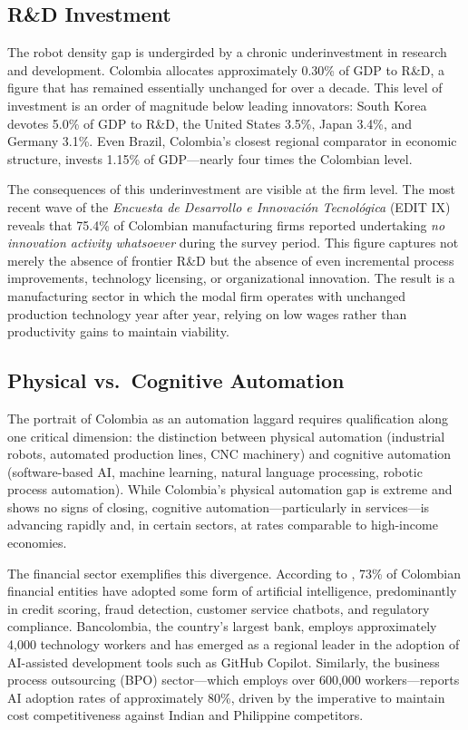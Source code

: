 \documentclass{article}
\begin{document}
\subsection{R\&D Investment}
\label{subsec:rd_investment}

The robot density gap is undergirded by a chronic underinvestment in research and development. Colombia allocates approximately 0.30\% of GDP to R\&D, a figure that has remained essentially unchanged for over a decade. This level of investment is an order of magnitude below leading innovators: South Korea devotes 5.0\% of GDP to R\&D, the United States 3.5\%, Japan 3.4\%, and Germany 3.1\%. Even Brazil, Colombia's closest regional comparator in economic structure, invests 1.15\% of GDP---nearly four times the Colombian level.

The consequences of this underinvestment are visible at the firm level. The most recent wave of the \textit{Encuesta de Desarrollo e Innovaci\'on Tecnol\'ogica} (EDIT IX) reveals that 75.4\% of Colombian manufacturing firms reported undertaking \textit{no innovation activity whatsoever} during the survey period. This figure captures not merely the absence of frontier R\&D but the absence of even incremental process improvements, technology licensing, or organizational innovation. The result is a manufacturing sector in which the modal firm operates with unchanged production technology year after year, relying on low wages rather than productivity gains to maintain viability.

\subsection{Physical vs.\ Cognitive Automation}
\label{subsec:physical_cognitive}

The portrait of Colombia as an automation laggard requires qualification along one critical dimension: the distinction between physical automation (industrial robots, automated production lines, CNC machinery) and cognitive automation (software-based AI, machine learning, natural language processing, robotic process automation). While Colombia's physical automation gap is extreme and shows no signs of closing, cognitive automation---particularly in services---is advancing rapidly and, in certain sectors, at rates comparable to high-income economies.

The financial sector exemplifies this divergence. According to \cite{asobancaria2024}, 73\% of Colombian financial entities have adopted some form of artificial intelligence, predominantly in credit scoring, fraud detection, customer service chatbots, and regulatory compliance. Bancolombia, the country's largest bank, employs approximately 4,000 technology workers and has emerged as a regional leader in the adoption of AI-assisted development tools such as GitHub Copilot. Similarly, the business process outsourcing (BPO) sector---which employs over 600,000 workers---reports AI adoption rates of approximately 80\%, driven by the imperative to maintain cost competitiveness against Indian and Philippine competitors.
\end{document}
